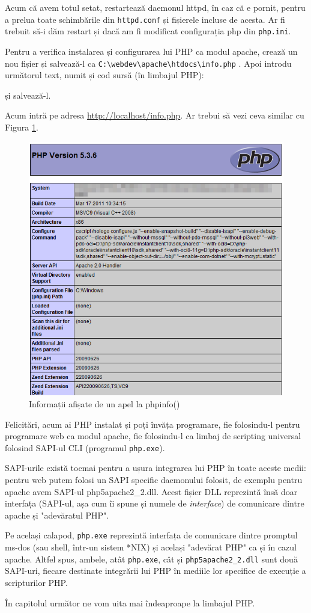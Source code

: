 Acum că avem totul setat, restartează daemonul httpd, în caz că e pornit, pentru a prelua
toate schimbările din \texttt{httpd.conf} și fișierele incluse de acesta. Ar fi trebuit să-i
dăm restart și dacă am fi modificat configurația php din \texttt{php.ini}.

Pentru a verifica instalarea și configurarea lui PHP ca modul apache, crează un nou fișier
și salvează-l ca 
\texttt{C:{\textbackslash}webdev{\textbackslash}apache{\textbackslash}htdocs{\textbackslash}info.php}
. Apoi introdu următorul text, numit și cod sursă (în limbajul PHP):

și salvează-l. 

Acum intră pe adresa \url{http://localhost/info.php}. Ar trebui să vezi ceva similar cu Figura \ref{img:php phpinfo}.

\begin{figure}[ht!]
 \centering
   \includegraphics[width=300bp]{cap01/Screenshot-15.png}
 \caption{Informații afișate de un apel la phpinfo()}
 \label{img:php phpinfo}
\end{figure}

Felicitări, acum ai PHP instalat și poți învăța programare, fie folosindu-l pentru programare web
ca modul apache, fie folosindu-l ca limbaj de scripting universal folosind SAPI-ul CLI (programul \texttt{php.exe}).

SAPI-urile există tocmai pentru a ușura integrarea lui PHP în toate aceste medii: pentru web putem folosi
un SAPI specific daemonului folosit, de exemplu pentru apache avem SAPI-ul php5apache2\_2.dll.
Acest fișier DLL reprezintă însă doar interfața (SAPI-ul, așa cum îi spune și numele de \textsl{interface})
de comunicare dintre apache și "adevăratul PHP".

Pe același calapod, \texttt{php.exe} reprezintă interfața de comunicare dintre promptul ms-dos
(sau shell, într-un sistem *NIX) și același "adevărat PHP" ca și în cazul apache. Altfel spus,
ambele, atât \texttt{php.exe}, cât și \texttt{php5apache2\_2.dll} sunt două SAPI-uri,
fiecare destinate integrării lui PHP în mediile lor specifice de execuție a scripturilor PHP.

În capitolul următor ne vom uita mai îndeaproape la limbajul PHP.
